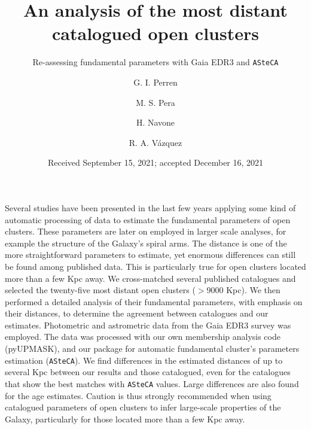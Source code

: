 \documentclass[draft]{aa}
\begin{document}
 


\title{An analysis of the most distant catalogued open clusters}
\subtitle{Re-assessing fundamental parameters with Gaia EDR3 and \texttt{ASteCA}}

\author{G. I. Perren
      \and
      M. S. Pera
      \and
      H. Navone
      \and
      R. A. Vázquez
}

\date{Received September 15, 2021; accepted December 16, 2021}

 
\abstract
{Several studies have been presented in the last few years applying some kind of
automatic processing of data to estimate the fundamental parameters of open
clusters. These parameters are later on employed in larger scale analyses, for
example the structure of the Galaxy's spiral arms.
The distance is one of the more straightforward parameters to estimate, yet
enormous differences can still be found among published data. This is
particularly true for open clusters located more than a few Kpc away.}
{
We cross-matched several published catalogues and selected the twenty-five most
distant open clusters ($>$9000 Kpc). We then performed a detailed analysis of
their fundamental parameters, with emphasis on their distances, to determine the
agreement between catalogues and our estimates.}
{Photometric and astrometric data from the Gaia EDR3 survey was employed. The
data was processed with our own membership analysis code (pyUPMASK), and our
package for automatic fundamental cluster's parameters estimation
(\texttt{ASteCA}).}
{We find differences in the estimated distances of up to several Kpc
between our results and those catalogued, even for the catalogues that show the
best matches with \texttt{ASteCA} values. Large differences are also found for
the age estimates.}
{Caution is thus strongly recommended when using catalogued parameters of open
clusters to infer large-scale properties of the Galaxy, particularly for those
located more than a few Kpc away.}
\end{document}
